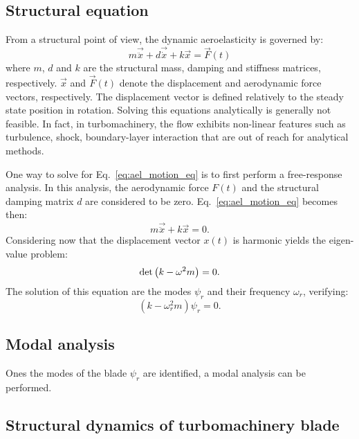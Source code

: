 
\subsection{Structural equation}
\label{sub:structural_equation}

From a structural point of view, 
the dynamic aeroelasticity is governed by:
\begin{equation}
	m \vec{\ddot{x}} + d \vec{\dot{x}} + k \vec{x} = \vec{F}(t)
	\label{eq:ael_motion_eq}
\end{equation}
where $m$, $d$ and $k$ are the structural mass, damping 
and stiffness matrices, respectively.
$\vec{x}$ and $\vec{F}(t)$ denote the displacement 
and aerodynamic force vectors, respectively. The displacement
vector is defined relatively to the 
steady state position in rotation.
Solving this equations analytically is generally 
not feasible. In fact, in turbomachinery, 
the flow exhibits non-linear features such as turbulence, shock,
boundary-layer interaction that are out of reach for
analytical methods.

One way to solve for Eq.~\eqref{eq:ael_motion_eq}
is to first perform a free-response analysis.
In this analysis, the aerodynamic force $F(t)$ and
the structural damping matrix $d$ are considered to be zero.
Eq.~\eqref{eq:ael_motion_eq} becomes then:
\begin{equation}
	m \vec{\ddot{x}} + k \vec{x} = 0.
	\label{eq:ael_motion_eq_free_response}
\end{equation}
Considering now that the displacement vector $x(t)$ is harmonic
yields the eigen-value problem:
\begin{equation}
	\mdet \left(k - \omega^2 m  \right) = 0.
	\label{eq:ael_motion_eq_eigen_value}
\end{equation}
The solution of this equation are the modes $\psi_r$
and their frequency $\omega_r$, verifying:
\begin{equation}
	\left(k - \omega_r^2 m  \right) \psi_r = 0.
\end{equation}

\subsection{Modal analysis}
\label{sub:modal_analysis}

Ones the modes of the blade $\psi_r$ are identified,
a modal analysis can be performed.


\subsection{Structural dynamics of turbomachinery blade}
\label{sub:structural_dynamics_of_turbomachinery_blade}

